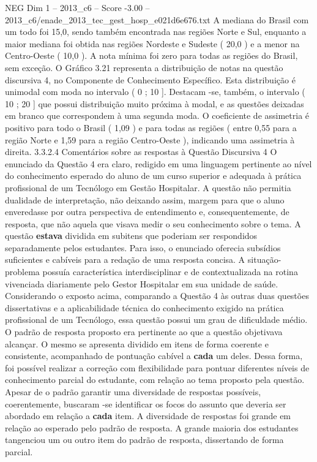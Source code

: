 \begin{textsample}{NEG Dim 1 – 2013\_c6 – Score -3.00 – 2013\_c6/enade\_2013\_tec\_gest\_hosp\_e021d6e676.txt}
A mediana do Brasil com um todo foi 15,0, sendo também encontrada nas regiões Norte e Sul, enquanto a maior mediana foi obtida nas regiões Nordeste e Sudeste ( 20,0 ) e a menor na Centro-Oeste ( 10,0 ).
A nota mínima foi zero para todas as regiões do Brasil, sem exceção.
O Gráfico 3.21 representa a distribuição de notas na questão discursiva 4, no Componente de Conhecimento Específico.
Esta distribuição é unimodal com moda no intervalo ( 0 ; 10 ].
Destacam -se, também, o intervalo ( 10 ; 20 ] que possui distribuição muito próxima à modal, e as questões deixadas em branco que correspondem à uma segunda moda.
O coeficiente de assimetria é positivo para todo o Brasil ( 1,09 ) e para todas as regiões ( entre 0,55 para a região Norte e 1,59 para a região Centro-Oeste ), indicando uma assimetria à direita. 3.3.2.4 Comentários sobre as respostas à Questão Discursiva 4 O enunciado da Questão 4 era claro, redigido em uma linguagem pertinente ao nível do conhecimento esperado do aluno de um curso superior e adequada à prática profissional de um Tecnólogo em Gestão Hospitalar.
A questão não permitia dualidade de interpretação, não deixando assim, margem para que o aluno enveredasse por outra perspectiva de entendimento e, consequentemente, de resposta, que não aquela que visava medir o seu conhecimento sobre o tema.
A questão \textbf{estava} dividida em subitens que poderiam ser respondidos separadamente pelos estudantes.
Para isso, o enunciado oferecia subsídios suficientes e cabíveis para a redação de uma resposta concisa.
A situação-problema possuía característica interdisciplinar e de contextualizada na rotina vivenciada diariamente pelo Gestor Hospitalar em sua unidade de saúde.
Considerando o exposto acima, comparando a Questão 4 às outras duas questões dissertativas e a aplicabilidade técnica do conhecimento exigido na prática profissional de um Tecnólogo, essa questão possui um grau de dificuldade médio.
O padrão de resposta proposto era pertinente ao que a questão objetivava alcançar.
O mesmo se apresenta dividido em itens de forma coerente e consistente, acompanhado de pontuação cabível a \textbf{cada} um deles.
Dessa forma, foi possível realizar a correção com flexibilidade para pontuar diferentes níveis de conhecimento parcial do estudante, com relação ao tema proposto pela questão.
Apesar de o padrão garantir uma diversidade de respostas possíveis, coerentemente, buscaram -se identificar os focos do assunto que deveria ser abordado em relação a \textbf{cada} item.
A diversidade de respostas foi grande em relação ao esperado pelo padrão de resposta.
A grande maioria dos estudantes tangenciou um ou outro item do padrão de resposta, dissertando de forma parcial.

\end{textsample}
